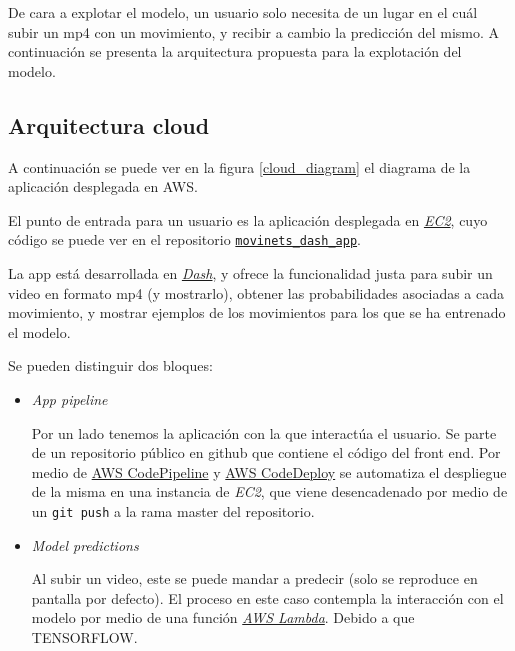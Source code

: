 De cara a explotar el modelo, un usuario solo necesita de un lugar en el cuál subir un mp4 con un movimiento, y recibir a cambio la predicción del mismo. A continuación se presenta la arquitectura propuesta para la explotación del modelo. 

\subsection{Arquitectura cloud}

A continuación se puede ver en la figura \ref{cloud_diagram} el diagrama de la aplicación desplegada en AWS.

El punto de entrada para un usuario es la aplicación desplegada en \href{https://aws.amazon.com/es/ec2/}{\textit{EC2}}, cuyo código se puede ver en el repositorio \href{https://github.com/plaguss/movinets_dash_app}{\texttt{movinets\_dash\_app}}.

La app está desarrollada en \href{https://plotly.com/dash/}{\textit{Dash}}, y ofrece la funcionalidad justa para subir un video en formato mp4 (y mostrarlo), obtener las probabilidades asociadas a cada movimiento, y mostrar ejemplos de los movimientos para los que se ha entrenado el modelo.

Se pueden distinguir dos bloques:

\begin{itemize}

  \item \textit{App pipeline}

Por un lado tenemos la aplicación con la que interactúa el usuario.
Se parte de un repositorio público en github que contiene el código del front end. Por medio de \href{https://aws.amazon.com/es/codepipeline/}{AWS CodePipeline} y \href{https://aws.amazon.com/es/codedeploy/}{AWS CodeDeploy} se automatiza el despliegue de la misma en una instancia de \textit{EC2}, que viene desencadenado por medio de un \texttt{git push} a la rama master del repositorio.

  \item \textit{Model predictions}

Al subir un video, este se puede mandar a predecir (solo se reproduce en pantalla por defecto). El proceso en este caso contempla la interacción con el modelo por medio de una función \href{https://aws.amazon.com/es/lambda/}{\textit{AWS Lambda}}. Debido a que TENSORFLOW.


\end{itemize}


